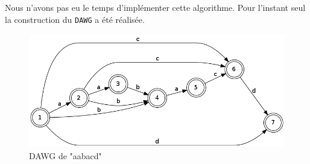 \documentclass[a4paper,11pt]{article}
\begin{document}
Nous n'avons pas eu le temps d'implémenter cette algorithme. Pour l'instant seul la construction du \texttt{DAWG} a été réalisée.

\begin{figure}[h]
  \centering
  \includegraphics[width=15cm]{dawg.png}
  \caption{DAWG de "aabacd"}
  \label{fig:dawg}
\end{figure}
\end{document}
